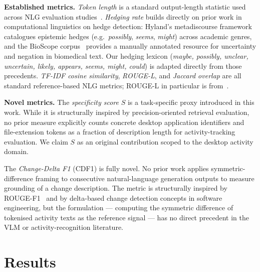 \documentclass[10pt, twocolumn]{article}
\begin{document}
\textbf{Established metrics.}
\emph{Token length} is a standard output-length statistic used across NLG evaluation
studies~\cite{lin2004rouge}.
\emph{Hedging rate} builds directly on prior work in computational linguistics on
hedge detection: Hyland's metadiscourse framework~\cite{hyland2005metadiscourse}
catalogues epistemic hedges (e.g.\ \textit{possibly}, \textit{seems}, \textit{might})
across academic genres, and the BioScope corpus~\cite{vincze2008bioscope} provides a
manually annotated resource for uncertainty and negation in biomedical text.
Our hedging lexicon (\textit{maybe, possibly, unclear, uncertain, likely, appears,
seems, might, could}) is adapted directly from those precedents.
\emph{TF-IDF cosine similarity}, \emph{ROUGE-L}, and \emph{Jaccard overlap} are
all standard reference-based NLG metrics; ROUGE-L in particular is
from~\cite{lin2004rouge}.

\textbf{Novel metrics.}
The \emph{specificity score} $S$ is a task-specific proxy introduced in this work.
While it is structurally inspired by precision-oriented retrieval evaluation, no prior
measure explicitly counts concrete desktop application identifiers and file-extension
tokens as a fraction of description length for activity-tracking evaluation.
We claim $S$ as an original contribution scoped to the desktop activity domain.

The \emph{Change-Delta F1} (CDF1) is fully novel.
No prior work applies symmetric-difference framing to consecutive natural-language
generation outputs to measure grounding of a change description.
The metric is structurally inspired by ROUGE-F1~\cite{lin2004rouge} and by
delta-based change detection concepts in software engineering, but the formulation ---
computing the symmetric difference of tokenised activity texts as the reference signal ---
has no direct precedent in the VLM or activity-recognition literature.

\section{Results}
\label{sec:results}
\end{document}

